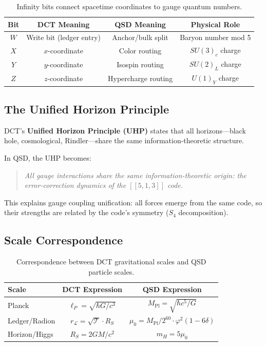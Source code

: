 \documentclass[11pt,a4paper]{article}
\theoremstyle{definition}
\newcommand{\Tc}{\mathcal{T}}           %
\newcommand{\dgeo}{\delta}              %
\newcommand{\murad}{\mu_0}              %
\newcommand{\Mpl}{M_{\text{Pl}}}        %
\newcommand{\mH}{m_H}                   %
\newcommand{\LL}{\mathcal{L}}           %
\begin{document}
\begin{table}[h]
\centering
\begin{tabular}{cccc}
\toprule
\textbf{Bit} & \textbf{DCT Meaning} & \textbf{QSD Meaning} & \textbf{Physical Role} \\
\midrule
$W$ & Write bit (ledger entry) & Anchor/bulk split & Baryon number mod 5 \\
$X$ & $x$-coordinate & Color routing & $SU(3)_c$ charge \\
$Y$ & $y$-coordinate & Isospin routing & $SU(2)_L$ charge \\
$Z$ & $z$-coordinate & Hypercharge routing & $U(1)_Y$ charge \\
\bottomrule
\end{tabular}
\caption{Infinity bits connect spacetime coordinates to gauge quantum numbers.}
\end{table}

\subsection{The Unified Horizon Principle}

DCT's \textbf{Unified Horizon Principle (UHP)} states that all horizons---black hole, cosmological, Rindler---share the same information-theoretic structure.

In QSD, the UHP becomes:

\begin{quote}
\emph{All gauge interactions share the same information-theoretic origin: the error-correction dynamics of the $[[5,1,3]]$ code.}
\end{quote}

This explains gauge coupling unification: all forces emerge from the same code, so their strengths are related by the code's symmetry ($S_4$ decomposition).

\subsection{Scale Correspondence}

\begin{table}[h]
\centering
\begin{tabular}{lcc}
\toprule
\textbf{Scale} & \textbf{DCT Expression} & \textbf{QSD Expression} \\
\midrule
Planck & $\ell_P = \sqrt{\hbar G/c^3}$ & $\Mpl = \sqrt{\hbar c^5/G}$ \\
Ledger/Radion & $r_{\LL} = \sqrt{\Tc} \cdot R_S$ & $\murad = \Mpl/2^{60} \cdot \varphi^2(1-6\dgeo)$ \\
Horizon/Higgs & $R_S = 2GM/c^2$ & $\mH = 5\murad$ \\
\bottomrule
\end{tabular}
\caption{Correspondence between DCT gravitational scales and QSD particle scales.}
\end{table}
\end{document}

